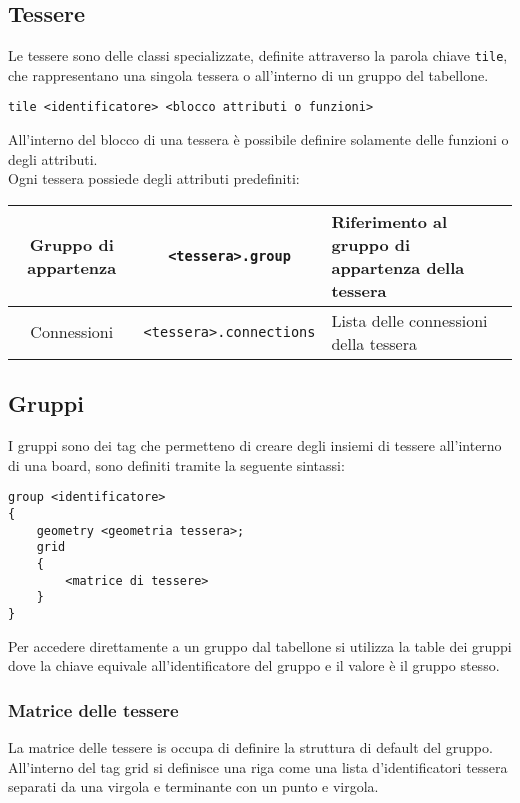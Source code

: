 \subsection{Tessere}
Le tessere sono delle classi specializzate, definite attraverso la parola chiave \lstinline|tile|,
che rappresentano una singola tessera o all'interno di un gruppo del tabellone. \\
\begin{lstlisting}
tile <identificatore> <blocco attributi o funzioni>
\end{lstlisting}
All'interno del blocco di una tessera è possibile definire solamente delle funzioni o degli attributi. \\ 
Ogni tessera possiede degli attributi predefiniti:
\begin{center}
\begin{tabular}{|c|c|p{5cm}|}
    \hline 
    Gruppo di appartenza & \lstinline|<tessera>.group| & Riferimento al gruppo di appartenza della tessera \\ 
    \hline
    Connessioni & \lstinline|<tessera>.connections| & Lista delle connessioni della tessera \\
    \hline 
\end{tabular}
\end{center}

\subsection{Gruppi}
I gruppi sono dei tag che permetteno di creare degli insiemi di tessere all'interno di una board,
sono definiti tramite la seguente sintassi:
\begin{lstlisting}
group <identificatore> 
{
    geometry <geometria tessera>;
    grid 
    {
        <matrice di tessere>
    }
}
\end{lstlisting}
Per accedere direttamente a un gruppo dal tabellone si utilizza la table dei gruppi
dove la chiave equivale all'identificatore del gruppo e il valore è il gruppo stesso.

\subsubsection{Matrice delle tessere}
La matrice delle tessere is occupa di definire la struttura di default del gruppo. \\
All'interno del tag grid si definisce una riga come una lista d'identificatori tessera
separati da una virgola e terminante con un punto e virgola.

